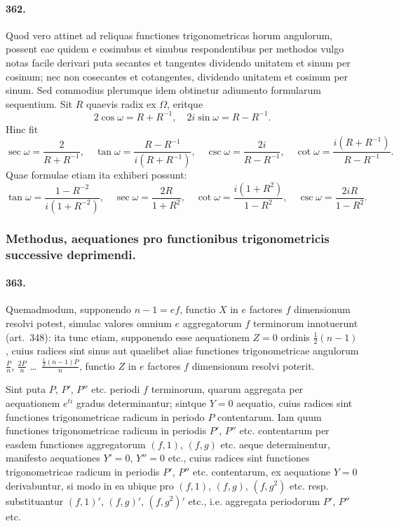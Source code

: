 \documentclass[12pt,a4paper]{article}
\theoremstyle{plain}
\theoremstyle{definition}
\theoremstyle{remark}
\begin{document}
\paragraph{362.}
Quod vero attinet ad reliquas functiones trigonometricas horum angulorum,
possent eae quidem e cosinubus et sinubus respondentibus per methodos vulgo
notas facile derivari puta secantes et tangentes dividendo unitatem et sinum per
cosinum; nec non cosecantes et cotangentes, dividendo unitatem et cosinum per
sinum. Sed commodius plerumque idem obtinetur adiumento formularum sequentium.
Sit $R$ quaevis radix ex $\Omega$, eritque
\[
2\cos\omega = R + R^{-1}, \quad 2i\sin\omega = R - R^{-1}.
\]
Hinc fit
\[
\sec\omega = \frac{2}{R + R^{-1}}, \quad \tan\omega = \frac{R - R^{-1}}{i(R + R^{-1})},
\quad
\csc\omega = \frac{2i}{R - R^{-1}}, \quad \cot\omega = \frac{i(R + R^{-1})}{R - R^{-1}}.
\]
Quae formulae etiam ita exhiberi possunt:
\[
\tan\omega = \frac{1 - R^{-2}}{i(1 + R^{-2})}, \quad
\sec\omega = \frac{2R}{1 + R^2}, \quad
\cot\omega = \frac{i(1 + R^2)}{1 - R^2}, \quad
\csc\omega = \frac{2iR}{1 - R^2}.
\]


\subsubsection*{Methodus, aequationes pro functionibus trigonometricis successive deprimendi.}

\paragraph{363.}
Quemadmodum, supponendo $n-1 = ef$, functio $X$ in $e$ factores
$f$ dimensionum resolvi potest, simulac valores omnium $e$ aggregatorum
$f$ terminorum innotuerunt (art.~348): ita tunc etiam, supponendo esse
aequationem $Z = 0$ ordinis $\frac{1}{2}(n-1)$, cuius radices sint sinus
aut quaelibet aliae functiones trigonometricae angulorum
$\frac{P}{n}$, $\frac{2P}{n}$ \ldots\ $\frac{\frac{1}{2}(n-1)P}{n}$, functio $Z$
in $e$ factores $f$ dimensionum resolvi poterit.

Sint puta $P$, $P'$, $P''$ etc. periodi $f$ terminorum, quarum aggregata
per aequationem $e^{ti}$ gradus determinantur; sintque $Y = 0$ aequatio,
cuius radices sint functiones trigonometricae radicum in periodo $P$
contentarum. Iam quum functiones trigonometricae radicum in periodis
$P'$, $P''$ etc. contentarum per easdem functiones aggregatorum
$(f,1)$, $(f,g)$ etc. aeque determinentur, manifesto aequationes $Y' = 0$,
$Y'' = 0$ etc., cuius radices sint functiones trigonometricae radicum in
periodis $P'$, $P''$ etc. contentarum, ex aequatione $Y = 0$ derivabuntur,
si modo in ea ubique pro $(f,1)$, $(f,g)$, $(f,g^2)$ etc. resp.
substituantur $(f,1)'$, $(f,g)'$, $(f,g^2)'$ etc., i.e. aggregata
periodorum $P'$, $P''$ etc.
\end{document}
